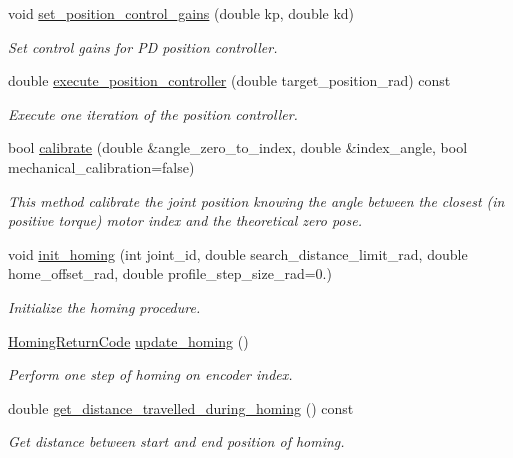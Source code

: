 \begin{DoxyCompactItemize}
void \hyperlink{classblmc__robots_1_1BlmcJointModule_a464ab2a846630eba6582d09895df2852}{set\+\_\+position\+\_\+control\+\_\+gains} (double kp, double kd)
\begin{DoxyCompactList}\small\item\em Set control gains for PD position controller. \end{DoxyCompactList}\item 
double \hyperlink{classblmc__robots_1_1BlmcJointModule_a3100c088a17264562c67429334e3dbf2}{execute\+\_\+position\+\_\+controller} (double target\+\_\+position\+\_\+rad) const
\begin{DoxyCompactList}\small\item\em Execute one iteration of the position controller. \end{DoxyCompactList}\item 
bool \hyperlink{classblmc__robots_1_1BlmcJointModule_a17a1da041dae31e9a16f955722c36d6c}{calibrate} (double \&angle\+\_\+zero\+\_\+to\+\_\+index, double \&index\+\_\+angle, bool mechanical\+\_\+calibration=false)
\begin{DoxyCompactList}\small\item\em This method calibrate the joint position knowing the angle between the closest (in positive torque) motor index and the theoretical zero pose. \end{DoxyCompactList}\item 
void \hyperlink{classblmc__robots_1_1BlmcJointModule_aa534604b5ead6a3eee5c47a9454f6834}{init\+\_\+homing} (int joint\+\_\+id, double search\+\_\+distance\+\_\+limit\+\_\+rad, double home\+\_\+offset\+\_\+rad, double profile\+\_\+step\+\_\+size\+\_\+rad=0.)
\begin{DoxyCompactList}\small\item\em Initialize the homing procedure. \end{DoxyCompactList}\item 
\hyperlink{blmc__joint__module_8hpp_aa1075809042ff261e4b0a20d161448b6}{Homing\+Return\+Code} \hyperlink{classblmc__robots_1_1BlmcJointModule_abb2712542f3c340bc0ecf76bd343b6b3}{update\+\_\+homing} ()
\begin{DoxyCompactList}\small\item\em Perform one step of homing on encoder index. \end{DoxyCompactList}\item 
double \hyperlink{classblmc__robots_1_1BlmcJointModule_a9fd53d7e340b4067f3505633e5a8a06d}{get\+\_\+distance\+\_\+travelled\+\_\+during\+\_\+homing} () const
\begin{DoxyCompactList}\small\item\em Get distance between start and end position of homing. \end{DoxyCompactList}\end{DoxyCompactItemize}
